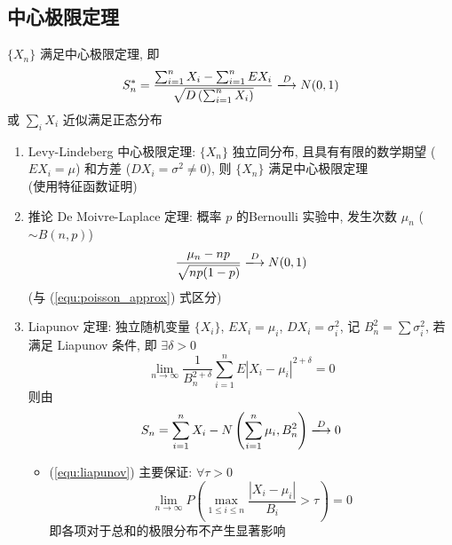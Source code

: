 \documentclass[11pt,a4paper,twocolumn]{article} %
\numberwithin{equation}{section} %
\begin{document}
\subsection{中心极限定理} %
\label{sub:central_limit}
$\{X_n\}$ 满足中心极限定理, 即
\begin{equation}
	S_n^* = \frac{\sum_{i=1}^n X_i - \sum_{i=1}^n EX_i}{\sqrt{D\left(
	\sum_{i=1}^n X_i\right)}} \xlongrightarrow{D} N(0,1)
\end{equation}
或 $\sum_i X_i$ 近似满足正态分布
\begin{enumerate}
	\item Levy-Lindeberg 中心极限定理: $\{X_n\}$ 独立同分布, 
	且具有有限的数学期望 ($EX_i = \mu$) 和方差 ($DX_i = \sigma^2\neq 0$), 
	则 $\{X_n\}$ 满足中心极限定理\\
	(使用特征函数证明)
	\item 推论 De Moivre-Laplace 定理: 概率 $p$ 的Bernoulli 实验中, 发生次数 
	$\mu_n$ ($\sim B(n, p)$)
	\begin{equation}
		\frac{\mu_n - np}{\sqrt{np(1-p)}} \xlongrightarrow{D} N(0, 1)
	\end{equation}
	(与 (\ref{equ:poisson_approx}) 式区分)
	\item Liapunov 定理: 独立随机变量 $\{X_i\}$, 
	$EX_i = \mu_i$, $DX_i = \sigma_i^2$, 
	记 $B_n^2 = \sum \sigma_i^2$, 
	若满足 Liapunov 条件, 即 $\exists \delta >0$
	\begin{equation}\label{equ:liapunov}
		\lim_{n\to\infty}\frac{1}{B_n^{2+\delta}}
		\sum_{i=1}^n E|X_i - \mu_i|^{2+\delta} = 0
	\end{equation}
	则由
	\begin{equation}
		S_n = \sum_{i=1}^n X_i - N\left(\sum_{i=1}^n\mu_i, B_n^2\right) 
		\xlongrightarrow{D} 0
	\end{equation}
	\begin{itemize}
		\item (\ref{equ:liapunov}) 主要保证: $\forall \tau >0$
		\begin{equation}
			\lim_{n\to\infty} P\left(\max_{1\le i \le n} 
			\frac{|X_i-\mu_i|}{B_i} > \tau\right) = 0
		\end{equation}
		即各项对于总和的极限分布不产生显著影响
	\end{itemize}
\end{enumerate}
\end{document}
